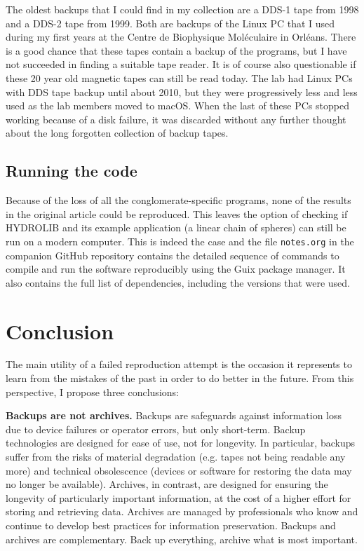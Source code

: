 The oldest backups that I could find in my collection are a DDS-1 tape from 1998 and a DDS-2 tape from 1999. Both are backups of the Linux PC that I used during my first years at the Centre de Biophysique Moléculaire in Orléans. There is a good chance that these tapes contain a backup of the programs, but I have not succeeded in finding a suitable tape reader. It is of course also questionable if these 20 year old magnetic tapes can still be read today. The lab had Linux PCs with DDS tape backup until about 2010, but they were progressively less and less used as the lab members moved to macOS. When the last of these PCs stopped working because of a disk failure, it was discarded without any further thought about the long forgotten collection of backup tapes.

\subsection*{Running the code}

Because of the loss of all the conglomerate-specific programs, none of the results in the original article could be reproduced. This leaves the option of checking if HYDROLIB and its example application (a linear chain of spheres) can still be run on a modern computer. This is indeed the case and the file \texttt{notes.org} in the companion GitHub repository contains the detailed sequence of commands to compile and run the software reproducibly using the Guix package manager. It also contains the full list of dependencies, including the versions that were used.

\section*{Conclusion}

The main utility of a failed reproduction attempt is the occasion it represents to learn from the mistakes of the past in order to do better in the future. From this perspective, I propose three conclusions:

\vspace{2mm}
\textbf{Backups are not archives.} Backups are safeguards against information loss due to device failures or operator errors, but only short-term. Backup technologies are designed for ease of use, not for longevity. In particular, backups suffer from the risks of material degradation (e.g. tapes not being readable any more) and technical obsolescence (devices or software for restoring the data may no longer be available). Archives, in contrast, are designed for ensuring the longevity of particularly important information, at the cost of a higher effort for storing and retrieving data. Archives are managed by professionals who know and continue to develop best practices for information preservation. Backups and archives are complementary. Back up everything, archive what is most important.

